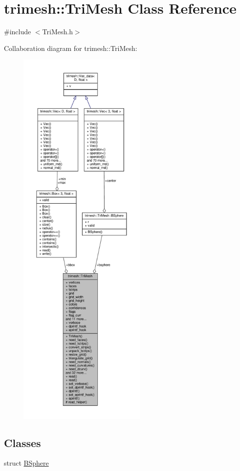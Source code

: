\hypertarget{classtrimesh_1_1TriMesh}{}\section{trimesh\+:\+:Tri\+Mesh Class Reference}
\label{classtrimesh_1_1TriMesh}


{\ttfamily \#include $<$Tri\+Mesh.\+h$>$}



Collaboration diagram for trimesh\+:\+:Tri\+Mesh\+:\nopagebreak
\begin{figure}[H]
\begin{center}
\leavevmode
\includegraphics[height=550pt]{dd/d06/classtrimesh_1_1TriMesh__coll__graph}
\end{center}
\end{figure}
\subsection*{Classes}
\begin{DoxyCompactItemize}
\item 
struct \hyperlink{structtrimesh_1_1TriMesh_1_1BSphere}{B\+Sphere}
\end{DoxyCompactItemize}
